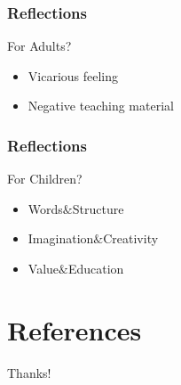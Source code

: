 \documentclass{beamer}
\begin{document}
\begin{frame}
    \frametitle{Reflections}
    \begin{block}{For Adults?}
        \begin{itemize}
            \item Vicarious feeling
            \item Negative teaching material
        \end{itemize}
    \end{block}
\end{frame}

\begin{frame}
    \frametitle{Reflections}
    \begin{block}{For Children?}
        \begin{itemize}
            \item Words$\&$Structure
            \item Imagination$\&$Creativity
            \item Value$\&$Education
        \end{itemize}
    \end{block}
\end{frame}

\section{References}

\begin{frame}[allowframebreaks]
    
    
\end{frame}

\begin{frame}
    \begin{center}
        {\Huge\calligra Thanks!}\cite[template]{origin}
    \end{center}
\end{frame}
\end{document}
